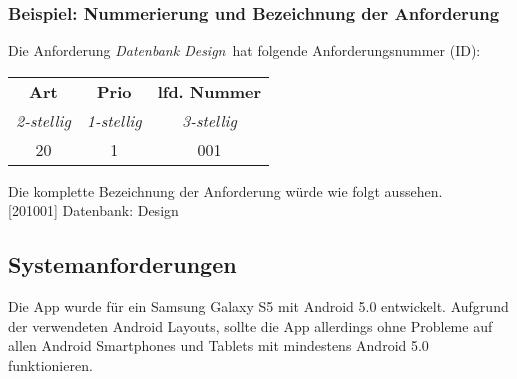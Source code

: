 \subsubsection{Beispiel: Nummerierung und Bezeichnung der Anforderung}

Die Anforderung  \glqq\emph{Datenbank Design}\grqq \ hat folgende Anforderungsnummer (ID):

\begin{table} [htbp]
	\centering
	\begin{tabular}{c|c|c}
		\textbf{Art} & \textbf{Prio} & \textbf{lfd. Nummer} \\
		\emph{2-stellig} & \emph{1-stellig} & \emph{3-stellig} \\ \hline
		20 & 1 & 001 \\
	\end{tabular}
\end{table}

Die komplette Bezeichnung der Anforderung würde wie folgt aussehen. \\

[201001] Datenbank: Design

\subsection{Systemanforderungen}

Die App wurde für ein Samsung Galaxy S5 mit Android 5.0 entwickelt. Aufgrund der verwendeten Android Layouts,
 sollte die App allerdings ohne Probleme auf allen Android Smartphones und Tablets mit mindestens Android 5.0 
 funktionieren.